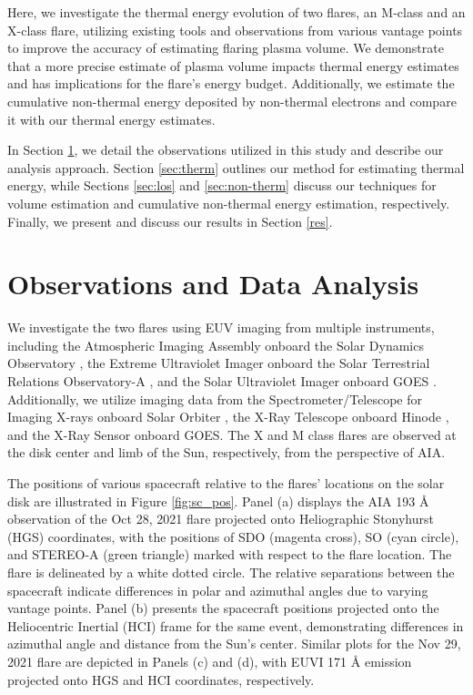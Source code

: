 Here, we investigate the thermal energy evolution of two flares, an M-class and an X-class flare, utilizing existing tools and observations from various vantage points to improve the accuracy of estimating flaring plasma volume. We demonstrate that a more precise estimate of plasma volume impacts thermal energy estimates and has implications for the flare's energy budget. Additionally, we estimate the cumulative non-thermal energy deposited by non-thermal electrons and compare it with our thermal energy estimates.

In Section \ref{sec:obs}, we detail the observations utilized in this study and describe our analysis approach. Section \ref{sec:therm} outlines our method for estimating thermal energy, while Sections \ref{sec:los} and \ref{sec:non-therm} discuss our techniques for volume estimation and cumulative non-thermal energy estimation, respectively. Finally, we present and discuss our results in Section \ref{res}.

\section{Observations and Data Analysis}\label{sec:obs}

We investigate the two flares using EUV imaging from multiple instruments, including the Atmospheric Imaging Assembly onboard the Solar Dynamics Observatory \citep[SDO/AIA;][]{sdo,aia}, the Extreme Ultraviolet Imager onboard the Solar Terrestrial Relations Observatory-A \citep[STEREO-A/EUVI;][]{stereo,euvi}, and the Solar Ultraviolet Imager onboard GOES \citep[GOES/SUVI;][]{suvi}. Additionally, we utilize imaging data from the Spectrometer/Telescope for Imaging X-rays onboard Solar Orbiter \citep[SO/STIX;][]{so,stix,stix1}, the X-Ray Telescope onboard Hinode \citep[Hinode/XRT;][]{xrt}, and the X-Ray Sensor onboard GOES. The X and M class flares are observed at the disk center and limb of the Sun, respectively, from the perspective of AIA.

The positions of various spacecraft relative to the flares' locations on the solar disk are illustrated in Figure \ref{fig:sc_pos}. Panel (a) displays the AIA 193 Å observation of the Oct 28, 2021 flare projected onto Heliographic Stonyhurst (HGS) coordinates, with the positions of SDO (magenta cross), SO (cyan circle), and STEREO-A (green triangle) marked with respect to the flare location. The flare is delineated by a white dotted circle. The relative separations between the spacecraft indicate differences in polar and azimuthal angles due to varying vantage points. Panel (b) presents the spacecraft positions projected onto the Heliocentric Inertial (HCI) frame for the same event, demonstrating differences in azimuthal angle and distance from the Sun's center. Similar plots for the Nov 29, 2021 flare are depicted in Panels (c) and (d), with EUVI 171 Å emission projected onto HGS and HCI coordinates, respectively.

